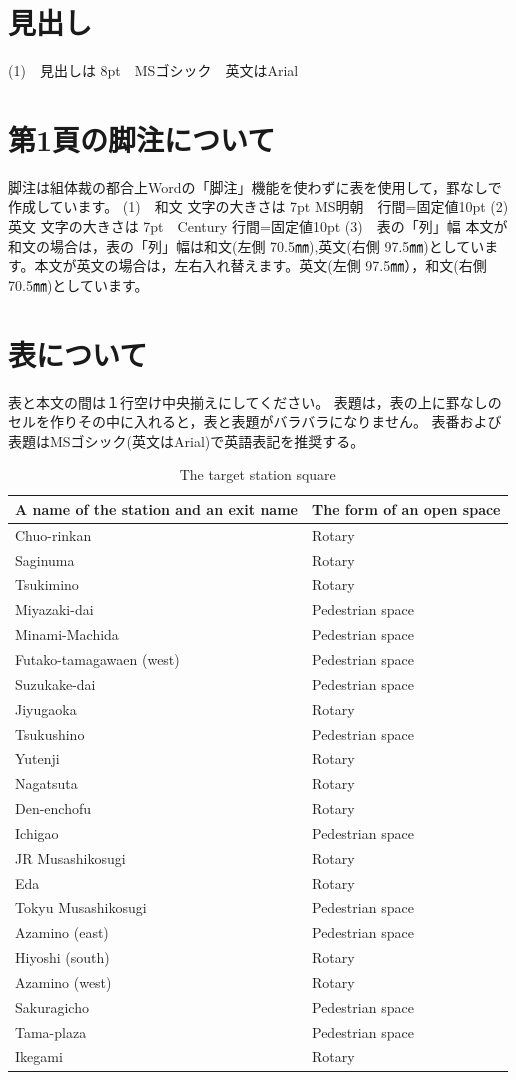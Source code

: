 \documentclass[base=10pt,magstyle=real,a4paper,twocolumn,xelatex,pandoc,jafont=ms]{bxjsarticle}
\begin{document}
\section{見出し}
(1)　見出しは 8pt　MSゴシック　英文はArial

\section{第1頁の脚注について}
脚注は組体裁の都合上Wordの「脚注」機能を使わずに表を使用して，罫なしで作成しています。
(1)　和文
文字の大きさは 7pt  MS明朝　行間=固定値10pt
(2)　英文
文字の大きさは 7pt　Century  行間=固定値10pt
(3)　表の「列」幅
本文が和文の場合は，表の「列」幅は和文(左側 70.5㎜),英文(右側 97.5㎜)としています。本文が英文の場合は，左右入れ替えます。英文(左側 97.5㎜），和文(右側 70.5㎜)としています。

\section{表について}
表と本文の間は１行空け中央揃えにしてください。
表題は，表の上に罫なしのセルを作りその中に入れると，表と表題がバラバラになりません。
表番および表題はMSゴシック(英文はArial)で英語表記を推奨する。

\begin{table}[H]
\caption{The target station square}
\small
\centering
\begin{tabular}{p{35mm}|p{35mm}}
	\hline 
	A name of the station and an exit name
 & The form of an open space
\\ 
	\hline \hline
	Chuo-rinkan & Rotary\\
	Saginuma & Rotary\\
	Tsukimino & Rotary\\
	Miyazaki-dai& Pedestrian space\\
	Minami-Machida& Pedestrian space\\
	Futako-tamagawaen (west)&Pedestrian space\\
	Suzukake-dai&Pedestrian space\\
	Jiyugaoka&Rotary\\
	Tsukushino&Pedestrian space\\
	Yutenji&Rotary\\
	Nagatsuta&Rotary\\
	Den-enchofu&Rotary\\
	Ichigao&Pedestrian space\\
	JR Musashikosugi&Rotary\\
	Eda&Rotary\\
	Tokyu Musashikosugi&	Pedestrian space\\
	Azamino (east)&Pedestrian space\\
	Hiyoshi (south)&Rotary\\
	Azamino (west)&Rotary\\
	Sakuragicho&Pedestrian space\\
	Tama-plaza&Pedestrian space\\
	Ikegami&Rotary\\
	\hline 
\end{tabular} 
\end{table}
\end{document}
